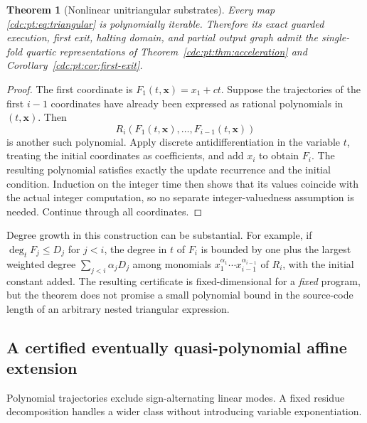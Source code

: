 \documentclass[11pt,a4paper]{article}
\newtheorem{theorem}{Theorem}[section]
\theoremstyle{definition}
\theoremstyle{remark}
\begin{document}
\begin{theorem}[Nonlinear unitriangular substrates]
\label{cdc:pt:thm:triangular}
Every map \eqref{cdc:pt:eq:triangular} is polynomially iterable. Therefore its
exact guarded execution, first exit, halting domain, and partial output
graph admit the single-fold quartic representations of
Theorem~\ref{cdc:pt:thm:acceleration} and Corollary~\ref{cdc:pt:cor:first-exit}.
\end{theorem}
\begin{proof}
The first coordinate is $F_1(t,\boldsymbol x)=x_1+ct$. Suppose the
trajectories of the first $i-1$ coordinates have already been expressed as
rational polynomials in $(t,\boldsymbol x)$. Then
\[
 R_i(F_1(t,\boldsymbol x),\ldots,F_{i-1}(t,\boldsymbol x))
\]
is another such polynomial. Apply discrete antidifferentiation in the
variable $t$, treating the initial coordinates as coefficients, and add
$x_i$ to obtain $F_i$. The resulting polynomial satisfies exactly the
update recurrence and the initial condition. Induction on the integer time
then shows that its values coincide with the actual integer computation,
so no separate integer-valuedness assumption is needed. Continue through
all coordinates.
\end{proof}

Degree growth in this construction can be substantial. For example, if
$\deg_t F_j\leq D_j$ for $j<i$, the degree in $t$ of $F_i$ is bounded by
one plus the largest weighted degree
$\sum_{j<i}\alpha_jD_j$ among monomials
$x_1^{\alpha_1}\cdots x_{i-1}^{\alpha_{i-1}}$ of $R_i$, with the
initial constant added. The resulting certificate is fixed-dimensional
for a \emph{fixed} program, but the theorem does not promise a small
polynomial bound in the source-code length of an arbitrary nested
triangular expression.

\subsection{A certified eventually quasi-polynomial affine extension}
Polynomial trajectories exclude sign-alternating linear modes. A fixed
residue decomposition handles a wider class without introducing variable
exponentiation.
\end{document}
